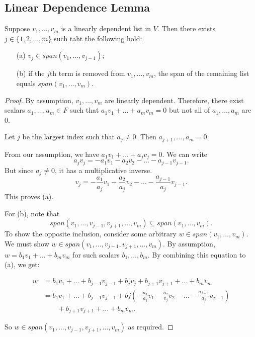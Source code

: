 \documentclass[11pt]{article}
\begin{document}
    \pagebreak

    \subsection{Linear Dependence Lemma}

    Suppose \(v_1, \dots, v_m\) is a linearly dependent list in $V$. Then there exists \(j \in \{1,2,\dots,m\}\) such taht the following hold:
    \begin{enumerate}
        \item[(a)] \(v_j \in span(v_1, \dots, v_{j-1});\)
        \item[(b)] if the $j$th term is removed from \(v_1, \dots, v_m\), the span of the remaining list equals \(span(v_1, \dots, v_m)\).   
    \end{enumerate}

    \begin{proof}
        By assumption, \(v_1, \dots, v_m\) are linearly dependent. Therefore, there exist scalars \(a_1, \dots, a_m \in F\) such that \(a_1 v_1 + \dots + a_m v_m = 0\) but not all of \(a_1, \dots, a_m\) are 0.

        Let $j$ be the largest index such that \(a_j \neq 0\). Then \(a_{j+1}, \dots, a_m = 0.\) 

        From our assumption, we have \(a_1 v_1 + \dots + a_j v_j = 0.\) We can write \[a_j v_j = -a_1 v_1 - a_2 v_2 - \dots - a_{j-1} v_{j-1}.\] But since \(a_j \neq 0\), it has a multiplicative inverse. \[v_j = - \frac{a_1}{a_j} v_1 - \frac{a_2}{a_j} v_2 - \dots - \frac{a_{j-1}}{a_j} v_{j-1}.\] This proves (a).

        For (b), note that \[span(v_1, \dots, v_{j-1}, v_{j+1}, \dots, v_m) \subseteq span(v_1, \dots, v_m).\] To show the opposite inclusion, consider some arbitrary \(w \in span(v_1, \dots, v_m).\) We must show \(w \in span(v_1, \dots, v_{j-1}, v_{j+1}, \dots, v_m).\) By assumption, \(w = b_1 v_1 + \dots + b_m v_m\) for such scalars \(b_1, \dots, b_m\). By combining this equation to (a), we get:

        \begin{align*}
            w &= b_1 v_1 + \dots + b_{j-1} v_{j-1} + b_j v_j + b_{j+1} v_{j+1} + \dots + b_m v_m \\
            &= b_1 v_1 + \dots + b_{j-1} v_{j-1} + bj \left( - \frac{a_1}{a_j} v_1 - \frac{a_2}{v_j} v_2 - \dots - \frac{a_{j-1}}{a_j} v_{j-1} \right) \\
            & \qquad + b_{j+1} v_{j+1} + \dots + b_m v_m.
        \end{align*}

        So \(w \in span(v_1, \dots, v_{j-1}, v_{j+1}, \dots, v_m)\) as required.
    \end{proof}
\end{document}
